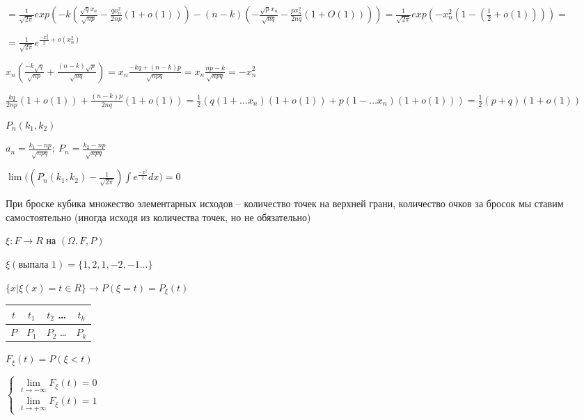 \documentclass[14pt, letter paper]{article}
\begin{document}
$= \frac{1}{\sqrt{2\pi}} exp(-k(\frac{\sqrt{q}x_n}{\sqrt{np}} - \frac{qx^2_n}{2np}(1 + o(1))) - (n-k)( - \frac{\sqrt{p}x_n}{\sqrt{nq}} - \frac{px^2_n}{2nq}(1 + O(1)))) = \frac{1}{\sqrt{2\pi}}exp(-x_n^2(1 - (\frac{1}{2} + o(1)))) =$

$= \frac{1}{\sqrt{2\pi}}e^{\frac{-x_n^2}{2} + o(x_n^2)}$

\vspace{3mm}

$x_n(\frac{-k\sqrt{q}}{\sqrt{np}} + \frac{(n-k)\sqrt{p}}{\sqrt{nq}}) = x_n \frac{-kq + (n-k)p}{\sqrt{npq}} = x_n \frac{np -k}{\sqrt{npq}} = -x_n^2$

\vspace{3mm}

$\frac{kq}{2np}(1 + o(1)) + \frac{(n - k)p}{2nq}(1 + o(1)) = \frac{1}{2}(q(1 + \ldots x_n)(1 + o(1)) + p(1 - \ldots x_n)(1 + o(1))) = \frac{1}{2}(p + q)(1 + o(1))$

\vspace{5mm}

$P_n(k_1, k_2)$

$a_n = \frac{k_1-np}{\sqrt{npq}};\ P_n = \frac{k_2 - np}{\sqrt{npq}}$

$\lim{((P_n(k_1, k_2) - \frac{1}{\sqrt{2\pi}})\int e^{\frac{-x^2}{2}}} dx) = 0$

\vspace{5mm}

При броске кубика множество элементарных исходов -- количество точек на верхней грани, количество очков за бросок мы ставим самостоятельно (иногда исходя из количества точек, но не обязательно)

$\xi : F \rightarrow R$ на $(\Omega, F, P)$

$\xi(\text{выпала 1}) = \{1, 2, 1, -2, -1 \ldots\}$

$\{x | \xi(x) = t \in R\} \rightarrow P(\xi = t) = P_\xi(t)$

\begin{center}
    \begin{tabular}{|c|c|c|c|}
        \hline
        $t$ & $t_1$ & $t_2$ \ldots & $t_k$ \\
        \hline
        $P$ & $P_1$ & $P_2$ \ldots & $P_k$ \\
        \hline
    \end{tabular}
\end{center}

$F_\xi(t) = P(\xi < t)$

$\begin{cases}
    \lim\limits_{t \rightarrow - \infty}{F_\xi(t)} = 0 \\
    \lim\limits_{t \rightarrow + \infty}{F_\xi(t)} = 1
\end{cases}$
\end{document}
